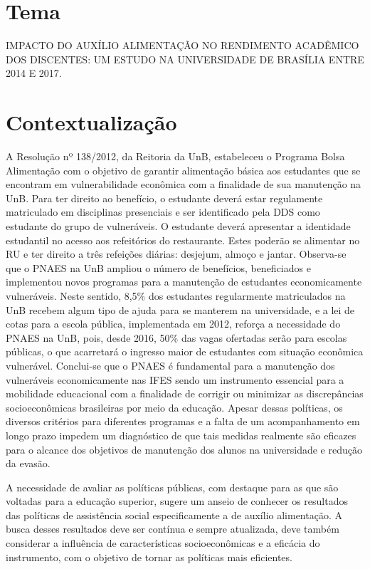 \section{Tema}%
IMPACTO DO AUXÍLIO ALIMENTAÇÃO NO RENDIMENTO ACADÊMICO DOS DISCENTES: UM ESTUDO NA UNIVERSIDADE DE BRASÍLIA ENTRE 2014 E 2017.

\section{Contextualização}%

A Resolução nº 138/2012, da Reitoria da UnB, estabeleceu o Programa Bolsa Alimentação com o objetivo de garantir alimentação básica aos estudantes que se encontram em vulnerabilidade econômica com a finalidade de sua manutenção na UnB. Para ter direito ao benefício, o estudante deverá estar regulamente matriculado em disciplinas presenciais e ser identificado pela DDS como estudante do grupo de vulneráveis. O estudante deverá apresentar a identidade estudantil no acesso aos refeitórios do restaurante. Estes poderão se alimentar no RU e ter direito a três refeições diárias: desjejum, almoço e jantar. 
Observa-se que o PNAES na UnB ampliou o número de benefícios, beneficiados e implementou novos programas para a manutenção de estudantes economicamente vulneráveis. Neste sentido, 8,5\% dos estudantes regularmente matriculados na UnB recebem algum tipo de ajuda para se manterem na universidade, e a lei de cotas para a escola pública, implementada em 2012, reforça a necessidade do PNAES na UnB, pois, desde 2016, 50\% das vagas ofertadas serão para escolas públicas, o que acarretará o ingresso maior de estudantes com situação econômica vulnerável.
Conclui-se que o PNAES é fundamental para a manutenção dos vulneráveis economicamente nas IFES sendo um instrumento essencial para a mobilidade educacional com a finalidade de corrigir ou minimizar as discrepâncias socioeconômicas brasileiras por meio da educação. 
Apesar dessas políticas, os diversos critérios para diferentes programas e a falta de um acompanhamento em longo prazo impedem um diagnóstico de que tais medidas realmente são eficazes para o alcance dos objetivos de manutenção dos alunos na universidade e redução da evasão.

A necessidade de avaliar as políticas públicas, com destaque para as que são voltadas para a educação superior, sugere um anseio de conhecer os resultados das políticas de assistência social especificamente a de auxílio alimentação. A busca desses resultados deve ser contínua e sempre atualizada, deve também considerar a influência de características socioeconômicas e a eficácia do instrumento, com o objetivo de tornar as políticas mais eficientes.


